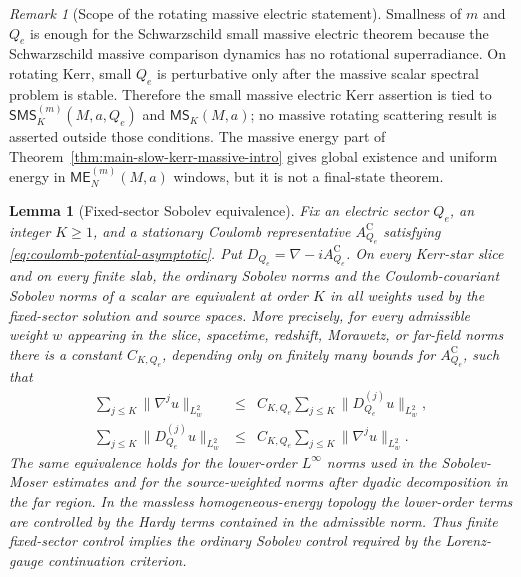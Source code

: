 \documentclass[11pt]{article}
\numberwithin{equation}{section}
\theoremstyle{plain}
\newtheorem{lemma}[theorem]{Lemma}
\theoremstyle{definition}
\theoremstyle{remark}
\newtheorem{remark}{Remark}[section]
\newcommand{\ME}{\mathsf{ME}}
\newcommand{\MScat}{\mathsf{MS}}
\newcommand{\SMS}{\mathsf{SMS}}
\begin{document}
\begin{remark}[Scope of the rotating massive electric statement]\label{rem:main-scope}
Smallness of \(m\) and \(Q_e\) is enough for the Schwarzschild small massive electric theorem because the Schwarzschild massive comparison dynamics has no rotational superradiance.  On rotating Kerr, small \(Q_e\) is perturbative only after the massive scalar spectral problem is stable.  Therefore the small massive electric Kerr assertion is tied to \(\SMS_K^{(m)}(M,a,Q_e)\) and \(\MScat_K(M,a)\); no massive rotating scattering result is asserted outside those conditions.  The massive energy part of Theorem~\ref{thm:main-slow-kerr-massive-intro} gives global existence and uniform energy in \(\ME_N^{(m)}(M,a)\) windows, but it is not a final-state theorem.
\end{remark}


\begin{lemma}[Fixed-sector Sobolev equivalence]\label{lem:fixed-sector-sobolev-equivalence}
Fix an electric sector $Q_e$, an integer $K\ge1$, and a stationary Coulomb representative $A^{\mathrm C}_{Q_e}$ satisfying \eqref{eq:coulomb-potential-asymptotic}.  Put $D_{Q_e}=\nabla-iA^{\mathrm C}_{Q_e}$.  On every Kerr-star slice and on every finite slab, the ordinary Sobolev norms and the Coulomb-covariant Sobolev norms of a scalar are equivalent at order $K$ in all weights used by the fixed-sector solution and source spaces.  More precisely, for every admissible weight $w$ appearing in the slice, spacetime, redshift, Morawetz, or far-field norms there is a constant $C_{K,Q_e}$, depending only on finitely many bounds for $A^{\mathrm C}_{Q_e}$, such that
\begin{eqnarray}
 \sum_{j\le K}\|\nabla^j u\|_{L^2_w}
 &\le& C_{K,Q_e}\sum_{j\le K}\|D_{Q_e}^{(j)}u\|_{L^2_w},\nonumber\\
 \sum_{j\le K}\|D_{Q_e}^{(j)}u\|_{L^2_w}
 &\le& C_{K,Q_e}\sum_{j\le K}\|\nabla^j u\|_{L^2_w}.
\end{eqnarray}
The same equivalence holds for the lower-order $L^\infty$ norms used in the Sobolev-Moser estimates and for the source-weighted norms after dyadic decomposition in the far region.  In the massless homogeneous-energy topology the lower-order terms are controlled by the Hardy terms contained in the admissible norm.  Thus finite fixed-sector control implies the ordinary Sobolev control required by the Lorenz-gauge continuation criterion.
\end{lemma}
\end{document}
